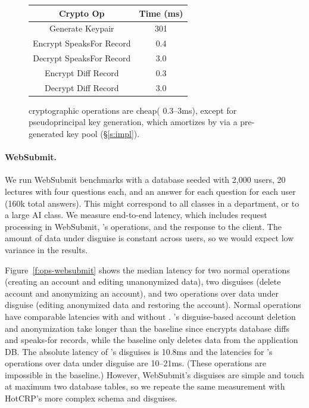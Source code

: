 \begin{figure}[t]
\begin{center}
\begin{tabular}{ c c }
\textbf{Crypto Op} & \textbf{Time (ms)}\\
\hline
Generate Keypair & 301\\
Encrypt SpeaksFor Record & 0.4\\
Decrypt SpeaksFor Record & 3.0\\
Encrypt Diff Record & 0.3\\
Decrypt Diff Record & 3.0\\
\end{tabular}
\end{center}
  \caption{\sys cryptographic operations are cheap( 0.3--3ms), except
  for pseudoprincipal key generation, which \sys amortizes by via a
  pre-generated key pool (\S\ref{s:impl}). }
\label{f:opstats}
\end{figure}

\paragraph{WebSubmit.}
%
We run WebSubmit benchmarks with a database seeded with 2,000 users, 20
lectures with four questions each, and an answer for each question for
each user (160k total answers).
%
This might correspond to all classes in a department, or to a large AI class.
%
We measure end-to-end latency, which includes request processing in WebSubmit,
\sys's operations, and the response to the client.
%
The amount of data under disguise is constant across users, so we would expect
low variance in the results.
%

%
Figure~\ref{f:ops-websubmit} shows the median latency for two normal operations
(creating an account and editing unanonymized data), two disguises (delete account
and anonymizing an account), and two operations over data under disguise (editing
anonymized data and restoring the account).
%
Normal operations have comparable latencies with and without \sys.
%
\sys's disguise-based account deletion and anonymization take longer than the
baseline since \sys encrypts database diffs and speaks-for records, while
the baseline only deletes data from the application DB.
%
The absolute latency of \sys's disguises is 10.8ms and the latencies for
\sys's operations over data under disguise are 10--21ms.
%
(These operations are impossible in the baseline.)
%
However, WebSubmit's disguises are simple and touch at maximum two database
tables, so we repeate the same measurement with HotCRP's more complex schema and
disguises.
%

